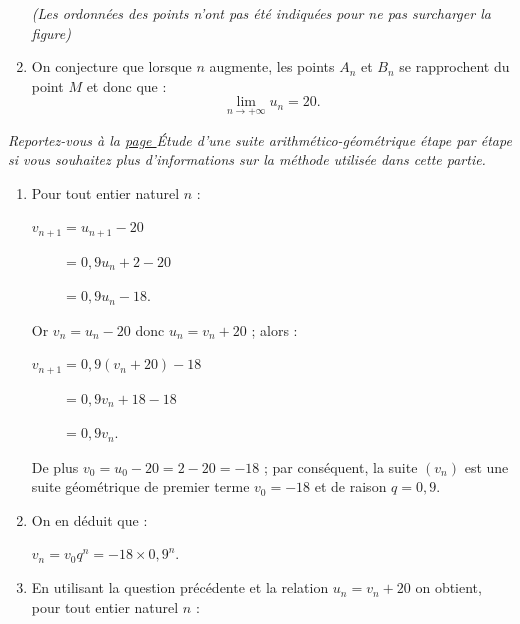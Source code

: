 \begin{corrige}
\begin{enumerate}
\begin{center}
               {\footnotesize \textit{(Les ordonnées des points n'ont pas été indiquées pour ne pas surcharger la figure)}}
          \end{center}
          \item
          On conjecture que lorsque $n$ augmente, les points $A_n$ et $B_n$ se rapprochent du point $M$ et donc que :
          \[ \lim_{n \rightarrow +\infty} u_n =20. \]
          \par
     \end{enumerate}
     \par
     \par
     \textit{Reportez-vous à la \hyperlink{suite-ag-pap}{page \pageref*{suite-ag-pap}}  \og \'Etude d'une suite arithmético-géométrique étape par étape  \fg{} si vous souhaitez plus d'informations sur la méthode utilisée dans cette partie.
     }
     \par
     \begin{enumerate}
          \item %
          Pour tout entier naturel $n$ :
          \par
          $v_{n+1}=u_{n+1}-20$
          \par
          $\phantom{v_{n+1}}=0,9u_n+2-20$
          \par
          $\phantom{v_{n+1}}=0,9u_n-18$.
          \par
          Or $v_n=u_n-20$ donc $u_n=v_n+20$ ; alors :
          \par
          $v_{n+1}=0,9(v_n+20)-18$
          \par
          $\phantom{v_{n+1}}=0,9v_n+18-18$
          \par
          $\phantom{v_{n+1}}=0,9v_n$.
          \par
          De plus ${v_0=u_0-20=2-20=-18}$ ; par conséquent, la suite $(v_n)$ est une suite géométrique de premier terme ${v_0=-18}$ et de raison ${q=0,9}$.
          \item %
          On en déduit que :
          \par
          $v_n=v_0q^n=-18 \times 0,9^n$.
          \item %
          En utilisant la question précédente et la relation $u_n=v_n+20$ on obtient, pour tout entier naturel $n$ :

\end{enumerate}
\end{corrige}
